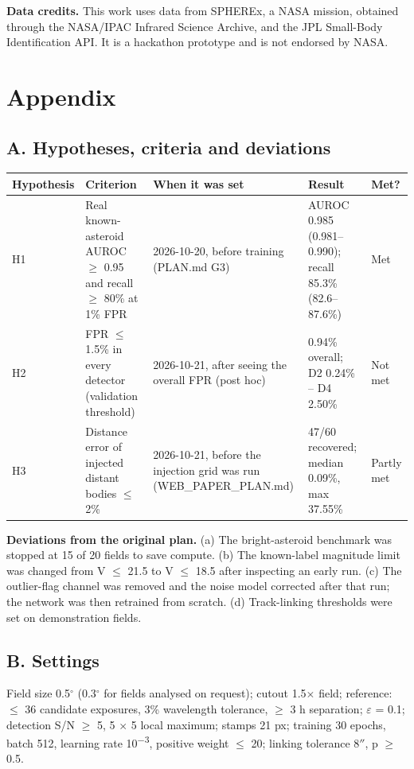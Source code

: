 \documentclass[twocolumn]{aastex631}
\begin{document}
\textbf{Data credits.} This work uses data from SPHEREx, a NASA mission, obtained through the NASA/IPAC Infrared Science Archive, and the JPL Small-Body Identification API. It is a hackathon prototype and is not endorsed by NASA.

\section*{Appendix}
\subsection*{A. Hypotheses, criteria and deviations}
\begin{table}[t]
\centering
\footnotesize

\begin{tabularx}{\textwidth}{lXXXl}
\hline\hline
Hypothesis & Criterion & When it was set & Result & Met? \\
\hline
H1 & Real known-asteroid AUROC $\ge$ 0.95 and recall $\ge$ 80\% at 1\% FPR & 2026-10-20, before training (PLAN.md G3) & AUROC 0.985 (0.981--0.990); recall 85.3\% (82.6--87.6\%) & Met \\
H2 & FPR $\le$ 1.5\% in every detector (validation threshold) & 2026-10-21, after seeing the overall FPR (post hoc) & 0.94\% overall; D2 0.24\% -- D4 2.50\% & Not met \\
H3 & Distance error of injected distant bodies $\le$ 2\% & 2026-10-21, before the injection grid was run (WEB\_PAPER\_PLAN.md) & 47/60 recovered; median 0.09\%, max 37.55\% & Partly met \\
\hline
\end{tabularx}
\end{table}
\textbf{Deviations from the original plan.} (a) The bright-asteroid benchmark was stopped at 15 of 20 fields to save compute. (b) The known-label magnitude limit was changed from V $\le$ 21.5 to V $\le$ 18.5 after inspecting an early run. (c) The outlier-flag channel was removed and the noise model corrected after that run; the network was then retrained from scratch. (d) Track-linking thresholds were set on demonstration fields.

\subsection*{B. Settings}
Field size 0.5$^\circ$ (0.3$^\circ$ for fields analysed on request); cutout 1.5$\times$ field; reference: $\le$ 36 candidate exposures, 3\% wavelength tolerance, $\ge$ 3 h separation; $\varepsilon$ = 0.1; detection S/N $\ge$ 5, 5 $\times$ 5 local maximum; stamps 21 px; training 30 epochs, batch 512, learning rate 10\textsuperscript{$-$3}, positive weight $\le$ 20; linking tolerance 8$''$, p $\ge$ 0.5.
\end{document}
